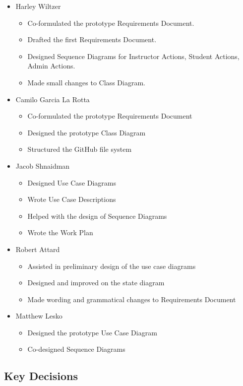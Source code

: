 \documentclass[12pt,openany]{report}
\begin{document}
\begin{itemize}
    \item Harley Wiltzer
	\begin{itemize}
		\item Co-formulated the prototype Requirements Document.
		\item Drafted the first Requirements Document.
		\item Designed Sequence Diagrams for Instructor Actions, Student Actions, Admin Actions.
		\item Made small changes to Class Diagram.
	\end{itemize}
    \item Camilo Garcia La Rotta
    \begin{itemize}
        \item Co-formulated the prototype Requirements Document
        \item Designed the prototype Class Diagram
        \item Structured the GitHub file system
    \end{itemize}
    \item Jacob Shnaidman
		\begin{itemize}
			\item Designed Use Case Diagrams
			\item Wrote Use Case Descriptions
			\item Helped with the design of Sequence Diagrams
			\item Wrote the Work Plan
		\end{itemize}
    \item Robert Attard
    \begin{itemize}
        \item Assisted in preliminary design of the use case diagrams
        \item Designed and improved on the state diagram
        \item Made wording and grammatical changes to Requirements Document
    \end{itemize}
    \item Matthew Lesko
    \begin{itemize}
    	\item Designed the prototype Use Case Diagram
    	\item Co-designed Sequence Diagrams
    \end{itemize}
\end{itemize}

\subsection*{Key Decisions}
\end{document}
